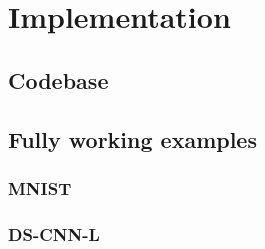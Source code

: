 \chapter{Implementation}\label{ch:implementation}
\lipsum[1]

\section{Codebase}
\lipsum[1]

\section{Fully working examples}
\lipsum[1]

\subsection{MNIST}
\lipsum[1]

\subsection{DS-CNN-L}
\lipsum[1]
